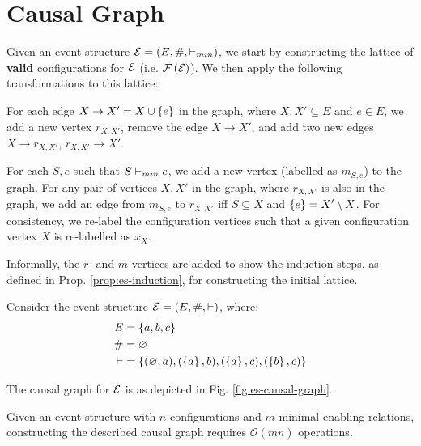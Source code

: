\section{Causal Graph}

Given an event structure $\mathcal{E} = (E, \#, \vdash_{min})$, we start by constructing
the lattice of \textbf{valid} configurations for $\mathcal{E}$ (i.e. $\mathcal{F} \left( \mathcal{E} \right)$).
We then apply the following transformations to this lattice:

For each edge $X \rightarrow X' = X \cup \left\{ e \right\}$ in the graph,
where $X, X' \subseteq E$ and $e \in E$,
we add a new vertex $r_{X,X'}$, remove the edge $X \rightarrow X'$,
and add two new edges $X \rightarrow r_{X,X'}$, $r_{X,X'} \rightarrow X'$.

For each $S, e$ such that $S \vdash_{min} e$, we add a new vertex
(labelled as $m_{S,e}$) to the graph. For any pair of vertices
$X, X'$ in the graph, where $r_{X,X'}$ is also in the graph, we add
an edge from $m_{S,e}$ to $r_{X,X'}$ iff $S \subseteq X$ and
$\left\{ e \right\} = X' \setminus X$. For consistency, we re-label the configuration vertices
such that a given configuration vertex $X$ is re-labelled as $x_{X}$.

Informally, the $r$- and $m$-vertices are added to show the
induction steps, as defined in Prop. \ref{prop:es-induction},
for constructing the initial lattice.

\begin{exmp}\label{ex:es}
Consider the event structure $\mathcal{E} = (E, \#, \vdash)$,
where:
\begin{equation*}
\begin{split}
  E      & = \left\{ a, b, c \right\} \\
  \#     & = \varnothing \\
  \vdash & = \left\{ 
    (\varnothing, a), (\left\{ a \right\}, b), (\left\{ a \right\}, c), (\left\{ b \right\}, c)
   \right\}
\end{split}
\end{equation*}

The causal graph for $\mathcal{E}$ is as depicted in Fig. \ref{fig:es-causal-graph}.



\end{exmp}

\begin{prop}
Given an event structure with $n$ configurations
and $m$ minimal enabling relations,
constructing the described causal graph requires $\mathcal{O}(mn)$ operations.
\end{prop}